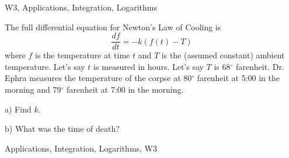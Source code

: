 \begin{tagblock}{W3, Applications, Integration, Logarithms}
\begin{question}
	
The full differential equation for Newton's Law of Cooling is
\[
\frac {df}{dt}=-k(f(t)-T)
\]
where $f$ is the temperature at time $t$ and $T$ is the (assumed constant) ambient temperature. Let's say $t$ is measured in hours. Let's say $T$ is 68$^{\circ}$ farenheit. Dr. Ephra measures the temperature of the corpse at 80$^{\circ}$ farenheit at 5:00 in the morning and 79$^{\circ}$ farenheit at 7:00 in the morning.

\bigskip

a) Find $k$.

\bigskip

b) What was the time of death?

    
\begin{tags}
        Applications, Integration, Logarithms, W3
\end{tags}
    
\begin{diary}
\end{diary}
	
\begin{solution}

\end{solution}
	
\end{question}

\end{tagblock}


